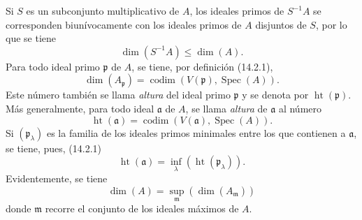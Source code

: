 \begin{env}[16.1.3]
\label{0.16.1.3-es}
Si $S$ es un subconjunto multiplicativo de $A$, los ideales primos de
$S^{-1}A$ se corresponden biunívocamente con los ideales primos de $A$
disjuntos de $S$, por lo que se tiene
\[
\label{0.16.1.3.1-es}
  \dim(S^{-1}A)\leq\dim(A).
\tag{16.1.3.1}
\]
Para todo ideal primo $\mathfrak{p}$ de $A$, se tiene, por definición (14.2.1),
\[
\label{0.16.1.3.2-es}
  \dim(A_{\mathfrak{p}})
  =\operatorname{codim}(V(\mathfrak{p}),\operatorname{Spec}(A)).
\tag{16.1.3.2}
\]
Este número también se llama \emph{altura} del ideal primo $\mathfrak{p}$ y se denota
por $\operatorname{ht}(\mathfrak{p})$. Más generalmente, para todo ideal
$\mathfrak{a}$ de $A$, se llama \emph{altura} de $\mathfrak{a}$ al número
\[
\label{0.16.1.3.3-es}
  \operatorname{ht}(\mathfrak{a})
  =\operatorname{codim}(V(\mathfrak{a}),\operatorname{Spec}(A)).
\tag{16.1.3.3}
\]
Si $(\mathfrak{p}_\lambda)$ es la familia de los ideales primos minimales entre
los que contienen a $\mathfrak{a}$, se tiene, pues, (14.2.1)
\[
\label{0.16.1.3.4-es}
  \operatorname{ht}(\mathfrak{a})
  =\inf_\lambda(\operatorname{ht}(\mathfrak{p}_\lambda)).
\tag{16.1.3.4}
\]
Evidentemente, se tiene
\[
\label{0.16.1.3.5-es}
  \dim(A)=\sup_{\mathfrak{m}}(\dim(A_{\mathfrak{m}}))
\tag{16.1.3.5}
\]
donde $\mathfrak{m}$ recorre el conjunto de los ideales máximos de $A$.
\end{env}

